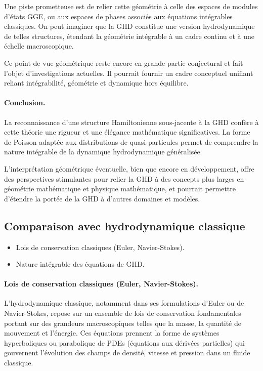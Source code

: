 Une piste prometteuse est de relier cette géométrie à celle des espaces de modules d’états GGE, ou aux espaces de phases associés aux équations intégrables classiques. On peut imaginer que la GHD constitue une version hydrodynamique de telles structures, étendant la géométrie intégrable à un cadre continu et à une échelle macroscopique.

Ce point de vue géométrique reste encore en grande partie conjectural et fait l’objet d’investigations actuelles. Il pourrait fournir un cadre conceptuel unifiant reliant intégrabilité, géométrie et dynamique hors équilibre.

\paragraph{Conclusion.}
La reconnaissance d’une structure Hamiltonienne sous-jacente à la GHD confère à cette théorie une rigueur et une élégance mathématique significatives. La forme de Poisson adaptée aux distributions de quasi-particules permet de comprendre la nature intégrable de la dynamique hydrodynamique généralisée.

L’interprétation géométrique éventuelle, bien que encore en développement, offre des perspectives stimulantes pour relier la GHD à des concepts plus larges en géométrie mathématique et physique mathématique, et pourrait permettre d’étendre la portée de la GHD à d’autres domaines et modèles.


\subsection{Comparaison avec hydrodynamique classique}
{\color{blue}
\begin{itemize}
    \item Lois de conservation classiques (Euler, Navier-Stokes).
    \item Nature intégrable des équations de GHD.
\end{itemize}
}


\paragraph{Lois de conservation classiques (Euler, Navier-Stokes).}
L’hydrodynamique classique, notamment dans ses formulations d’Euler ou de Navier-Stokes, repose sur un ensemble de lois de conservation fondamentales portant sur des grandeurs macroscopiques telles que la masse, la quantité de mouvement et l’énergie. Ces équations prennent la forme de systèmes hyperboliques ou parabolique de PDEs (équations aux dérivées partielles) qui gouvernent l’évolution des champs de densité, vitesse et pression dans un fluide classique.

